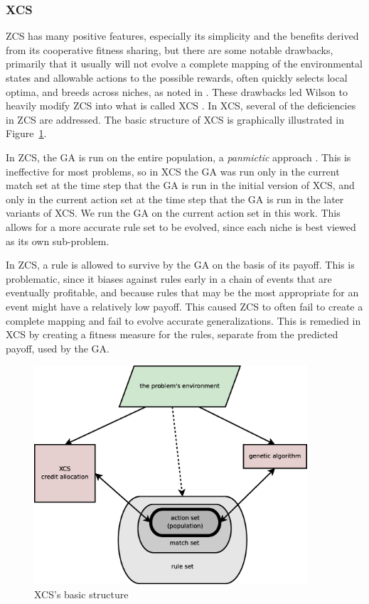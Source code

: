 \subsubsection{XCS}
ZCS has many positive features, especially its simplicity and the benefits derived from its cooperative fitness sharing, but there are some notable drawbacks, primarily that it usually will not evolve a complete mapping of the environmental states and allowable actions to the possible rewards, often quickly selects local optima, and breeds across niches, as noted in \cite{Wilson1995XCS}.
These drawbacks led Wilson to heavily modify ZCS into what is called XCS \cite{Wilson1995XCS}.
In XCS, several of the deficiencies in ZCS are addressed.
The basic structure of XCS is graphically illustrated in Figure~\ref{fig:xcs}.

In ZCS, the GA is run on the entire population, a \emph{panmictic} approach \cite[p.~155]{EibenSmith}.
This is ineffective for most problems, so in XCS the GA was run only in the current match set at the time step that the GA is run in the initial version of XCS, and only in the current action set at the time step that the GA is run in the later variants of XCS.
We run the GA on the current action set in this work.
This allows for a more accurate rule set to be evolved, since each niche is best viewed as its own sub-problem.

In ZCS, a rule is allowed to survive by the GA on the basis of its payoff.
This is problematic,
since it biases against rules early in a chain of events that are eventually profitable,
and because rules that may be the most appropriate for an event might have a relatively low payoff.
This caused ZCS to often fail to create a complete mapping and fail to evolve accurate generalizations.
This is remedied in XCS by creating a fitness measure for the rules, separate from the predicted payoff, used by the GA.

\begin{figure}
\begin{center}
\includegraphics[width=4in]{xcs-basic-diagram.eps}
\caption{XCS's basic structure}
\label{fig:xcs}
\end{center}
\end{figure}

